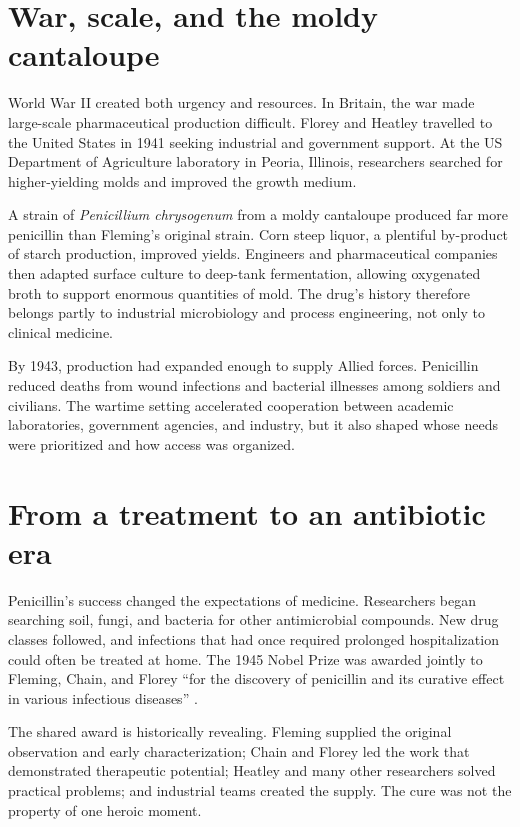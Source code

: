 \documentclass[12pt,oneside]{book}
\begin{document}
\section{War, scale, and the moldy cantaloupe}
World War II created both urgency and resources. In Britain, the war made
large-scale pharmaceutical production difficult. Florey and Heatley travelled
to the United States in 1941 seeking industrial and government support. At the
US Department of Agriculture laboratory in Peoria, Illinois, researchers
searched for higher-yielding molds and improved the growth medium.

A strain of \emph{Penicillium chrysogenum} from a moldy cantaloupe produced far
more penicillin than Fleming's original strain. Corn steep liquor, a plentiful
by-product of starch production, improved yields. Engineers and pharmaceutical
companies then adapted surface culture to deep-tank fermentation, allowing
oxygenated broth to support enormous quantities of mold. The drug's history
therefore belongs partly to industrial microbiology and process engineering,
not only to clinical medicine.

By 1943, production had expanded enough to supply Allied forces. Penicillin
reduced deaths from wound infections and bacterial illnesses among soldiers and
civilians. The wartime setting accelerated cooperation between academic
laboratories, government agencies, and industry, but it also shaped whose needs
were prioritized and how access was organized.

\section{From a treatment to an antibiotic era}
Penicillin's success changed the expectations of medicine. Researchers began
searching soil, fungi, and bacteria for other antimicrobial compounds. New drug
classes followed, and infections that had once required prolonged hospitalization
could often be treated at home. The 1945 Nobel Prize was awarded jointly to
Fleming, Chain, and Florey ``for the discovery of penicillin and its curative
effect in various infectious diseases'' \cite{nobel1945}.

The shared award is historically revealing. Fleming supplied the original
observation and early characterization; Chain and Florey led the work that
demonstrated therapeutic potential; Heatley and many other researchers solved
practical problems; and industrial teams created the supply. The cure was not
the property of one heroic moment.
\end{document}

